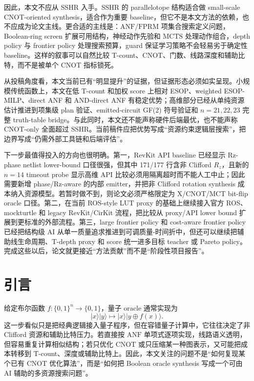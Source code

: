 \documentclass[UTF8,fontset=macnew,11pt]{ctexart}
\newcommand{\anf}{\ensuremath{\mathrm{ANF}}}
\newcommand{\fprm}{\ensuremath{\mathrm{FPRM}}}
\newcommand{\mcts}{\ensuremath{\mathrm{MCTS}}}
\newcommand{\xor}{\ensuremath{\oplus}}
\newcommand{\ttable}{truth-table}
\begin{document}
因此，本文不应从 SSHR 入手。SSHR 的 parallelotope 结构适合做 small-scale CNOT-oriented synthesis，适合作为重要 baseline，但它不是本文方法的依赖，也不应成为论文主线。更合适的主线是：\anf{}/\fprm{} 项集合搜索定义问题，Boolean-ring screen 扩展可用结构，神经动作先验和 \mcts{} 处理动作组合，depth policy 与 frontier policy 处理搜索预算，guard 保证学习策略不会轻易劣于确定性 baseline。这样的叙事可以自然比较 T-count、CNOT、门数、线路深度和辅助比特，而不是被单个 CNOT 指标锁死。

从投稿角度看，本文当前已有“明显提升”的证据，但证据形态必须如实呈现。小规模传统函数上，本文在低 T-count 和加权 score 上相对 ESOP、weighted ESOP-MILP、direct ANF 和 AND-direct ANF 有稳定优势；高维部分已经从单纯资源估计推进到项集级 plan 验证、emitted-circuit GF(2) 符号验证和 $n=21,22,23$ 完整 \ttable{} bridge。与此同时，本文还不能声称硬件后端最优，也不能声称 CNOT-only 全面超过 SSHR。当前稿件应把优势写成“资源约束逻辑层搜索”，把边界写成“仍需外部工具链和后端评估”。

下一步最值得投入的方向也很明确。第一，RevKit API baseline 已经显示 Rz-phase netlist lower-bound 口径很强，但其中 171/177 行含非 Clifford $R_z$，且新的 $n=14$ timeout probe 显示高维 API 比较必须用隔离超时而不能人工中止；因此需要新增 phase/Rz-aware 的内部 emitter，并把非 Clifford rotation synthesis 成本纳入资源模型。若暂时做不到，则论文必须严格限定为 X/CNOT/MCT bit-flip oracle 口径。第二，在当前 ROS-style LUT proxy 的基础上继续接入官方 ROS、mockturtle 和 legacy RevKit/CirKit 流程，把比较从 proxy/API lower bound 扩展到更标准的外部流程。第三，large frontier policy 和 cost-aware frontier policy 已经把结构级 AI 从单一质量追求推进到可调质量-时间折中，但还可以继续把辅助线生命周期、T-depth proxy 和 score 统一进多目标 teacher 或 Pareto policy。完成这些以后，论文就更接近“方法贡献”而不是“阶段性项目报告”。

\section{引言}

给定布尔函数 $f:\{0,1\}^n\rightarrow\{0,1\}$，量子 oracle 通常实现为
\begin{equation}
  |x\rangle |y\rangle \mapsto |x\rangle |y\xor f(x)\rangle .
  \label{eq:oracle}
\end{equation}
这一步看似只是把经典逻辑接入量子程序，但在容错量子计算中，它往往决定了非 Clifford 资源和辅助比特压力。若直接按 \anf{} 单项式逐项实现，线路语义透明，但容易重复计算相似结构；若只优化 CNOT 或只压缩某一种图表示，又可能把成本转移到 T-count、深度或辅助比特上。因此，本文关注的问题不是“如何复现某个已有 CNOT 优化算法”，而是“如何把 Boolean oracle synthesis 写成一个可由 AI 辅助的多资源搜索问题”。
\end{document}
